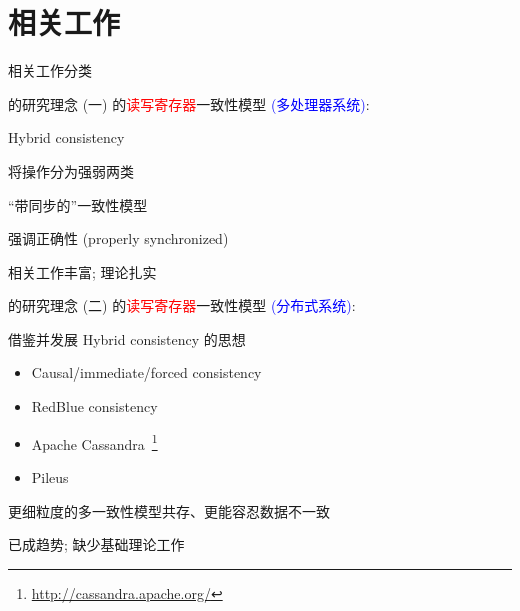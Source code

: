 \section{相关工作}	\label{section:related-work}

\begin{frame}{相关工作分类}
  
\end{frame}
\begin{frame}{\ideadt{}的研究理念 (一)}
  \ideadt{}的\textcolor{red}{读写寄存器}一致性模型 \textcolor{blue}{\footnotesize (多处理器系统)}:
  \pause
  \vspace{8pt}
  \begin{description}
	\setlength{\itemsep}{5pt}
	\item[典型:] Hybrid consistency 
	\item[思想:] 将操作分为强弱两类
	  \pause
	\item[其它:] ``带同步的''一致性模型  
	\item[特点:] 强调正确性 {\footnotesize (properly synchronized)}
	\item[总评:] 相关工作丰富; 理论扎实
  \end{description}
\end{frame}
\begin{frame}{\ideadt{}的研究理念 (二)}
  \ideadt{}的\textcolor{red}{读写寄存器}一致性模型 \textcolor{blue}{\footnotesize (分布式系统)}:
  \vspace{8pt}
  \begin{description}
	\setlength{\itemsep}{5pt}
	\item[思想:] 借鉴并发展 Hybrid consistency 的思想
	\item[典型:] 
	  \begin{itemize}
		\item Causal/immediate/forced consistency 
		\item RedBlue consistency 
		\item Apache Cassandra~\footnote{\url{http://cassandra.apache.org/}} 
		\item Pileus 
	  \end{itemize}
	  \pause
	\item[特点:] 更细粒度的多一致性模型共存、更能容忍数据不一致
	\item[总评:] 已成趋势; 缺少基础理论工作
  \end{description}
\end{frame}
